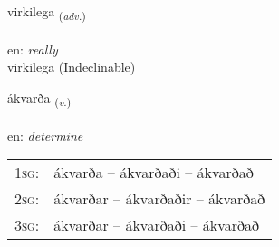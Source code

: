 \documentclass[frontgrid, backgrid]{flacards}\usepackage[]{graphicx}\usepackage[]{xcolor}
\begin{document}

\renewcommand{\flhead}{\vskip5pt \fboxsep=0pt {\small\bfseries\footnotesize Atviksorð | Adverb}}
\renewcommand{\fcfoot}{\vskip5pt \fboxsep=0pt \hspace{2pt}{\small\bfseries\footnotesize 3K}}

\renewcommand{\blhead}{\vskip5pt {\small\bfseries\footnotesize Atviksorð | Adverb }}
\renewcommand{\bcfoot}{\vskip5pt \hspace{2pt}{\small\bfseries\footnotesize 3K}}


{virkilega \small{\textsubscript{(\textit{adv.})}} \\[1ex]
 \\
en: \emph{really} \\  [2ex]
virkilega (Indeclinable)}

\renewcommand{\flhead}{\vskip5pt \fboxsep=0pt {\small\bfseries\footnotesize Sagnorð | Verb}}
\renewcommand{\fcfoot}{\vskip5pt \fboxsep=0pt \hspace{2pt}{\small\bfseries\footnotesize 3K}}

\renewcommand{\blhead}{\vskip5pt {\small\bfseries\footnotesize Sagnorð | Verb }}
\renewcommand{\bcfoot}{\vskip5pt \hspace{2pt}{\small\bfseries\footnotesize 3K}}


{ákvarða \small{\textsubscript{(\textit{v.})}} \\[1ex] %
\textphonetic{[auːkʰvarða]} \\
en: \emph{determine} \\  [2ex]
\renewcommand*{\arraystretch}{0.8}
\begin{tabular}{p{1cm}l}
\textsc{1sg}: & ákvarða -- ákvarðaði -- ákvarðað \\ 
\textsc{2sg}: & ákvarðar -- ákvarðaðir -- ákvarðað \\ 
\textsc{3sg}: & ákvarðar -- ákvarðaði -- ákvarðað \\ 
\end{tabular}
}
\end{document}
